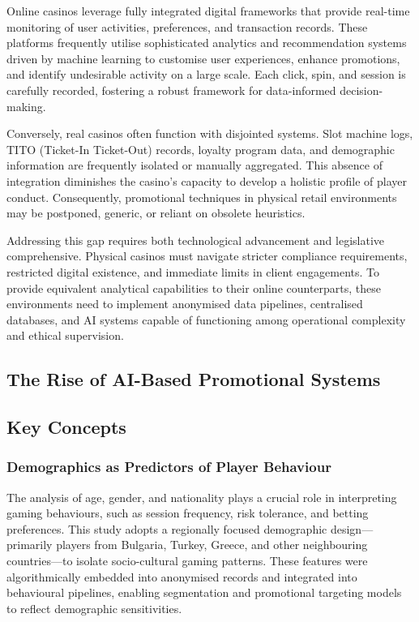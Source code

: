 \documentclass[12pt,a4paper]{report}
\begin{document}
Online casinos leverage fully integrated digital frameworks that provide real-time monitoring of user activities, preferences, and transaction records.  These platforms frequently utilise sophisticated analytics and recommendation systems driven by machine learning to customise user experiences, enhance promotions, and identify undesirable activity on a large scale.  Each click, spin, and session is carefully recorded, fostering a robust framework for data-informed decision-making.

 Conversely, real casinos often function with disjointed systems.  Slot machine logs, TITO (Ticket-In Ticket-Out) records, loyalty program data, and demographic information are frequently isolated or manually aggregated.  This absence of integration diminishes the casino's capacity to develop a holistic profile of player conduct.  Consequently, promotional techniques in physical retail environments may be postponed, generic, or reliant on obsolete heuristics.

 Addressing this gap requires both technological advancement and legislative comprehensive.  Physical casinos must navigate stricter compliance requirements, restricted digital existence, and immediate limits in client engagements.  To provide equivalent analytical capabilities to their online counterparts, these environments need to implement anonymised data pipelines, centralised databases, and AI systems capable of functioning among operational complexity and ethical supervision.

\subsection{The Rise of AI-Based Promotional Systems}


\subsection{Key Concepts}
\subsubsection{Demographics as Predictors of Player Behaviour}

The analysis of age, gender, and nationality plays a crucial role in interpreting gaming behaviours, such as session frequency, risk tolerance, and betting preferences. This study adopts a regionally focused demographic design—primarily players from Bulgaria, Turkey, Greece, and other neighbouring countries—to isolate socio-cultural gaming patterns. These features were algorithmically embedded into anonymised records and integrated into behavioural pipelines, enabling segmentation and promotional targeting models to reflect demographic sensitivities.
\end{document}
